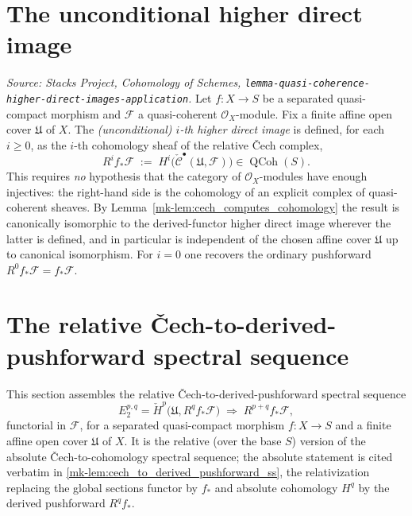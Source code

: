 \section{The unconditional higher direct image}

\begin{definition}\label{mk-def:cech_higher_direct_image}
  \leanok

  \textit{Source: Stacks Project, Cohomology of Schemes,
  \texttt{lemma-quasi-coherence-higher-direct-images-application}.}
  Let \(f : X \to S\) be a separated quasi-compact morphism and \(\mathcal{F}\) a
  quasi-coherent \(\mathcal{O}_X\)-module. Fix a finite affine open cover
  \(\mathfrak{U}\) of \(X\). The \emph{(unconditional) \(i\)-th higher direct
  image} is defined, for each \(i \geq 0\), as the \(i\)-th cohomology sheaf of the
  relative {\v C}ech complex,
  \[
    R^i f_*\mathcal{F} \;:=\;
      H^i\bigl(\check{\mathcal{C}}^\bullet(\mathfrak{U}, \mathcal{F})\bigr)
      \in \operatorname{QCoh}(S).
  \]
  This requires \emph{no} hypothesis that the category of \(\mathcal{O}_X\)-modules
  have enough injectives: the right-hand side is the cohomology of an explicit
  complex of quasi-coherent sheaves. By
  Lemma~\ref{mk-lem:cech_computes_cohomology} the result is canonically isomorphic to
  the derived-functor higher direct image wherever the latter is defined, and in
  particular is independent of the chosen affine cover \(\mathfrak{U}\) up to
  canonical isomorphism. For \(i = 0\) one recovers the ordinary
  pushforward \(R^0 f_*\mathcal{F} = f_*\mathcal{F}\).
\end{definition}

\section{The relative {\v C}ech-to-derived-pushforward spectral sequence}
\label{mk-sec:cech_to_derived_pushforward_ss}

This section assembles the relative {\v C}ech-to-derived-pushforward spectral
sequence
\[
  E_2^{p,q} = \check{H}^p\bigl(\mathfrak{U}, R^q f_* \mathcal{F}\bigr)
  \;\Longrightarrow\;
  R^{p+q} f_* \mathcal{F},
\]
functorial in \(\mathcal{F}\), for a separated quasi-compact morphism
\(f : X \to S\) and a finite affine open cover \(\mathfrak{U}\) of \(X\). It is the
relative (over the base \(S\)) version of the absolute {\v C}ech-to-cohomology
spectral sequence; the absolute statement is cited verbatim in
\ref{mk-lem:cech_to_derived_pushforward_ss}, the relativization replacing the global
sections functor by \(f_*\) and absolute cohomology \(H^q\) by the derived
pushforward \(R^q f_*\).

